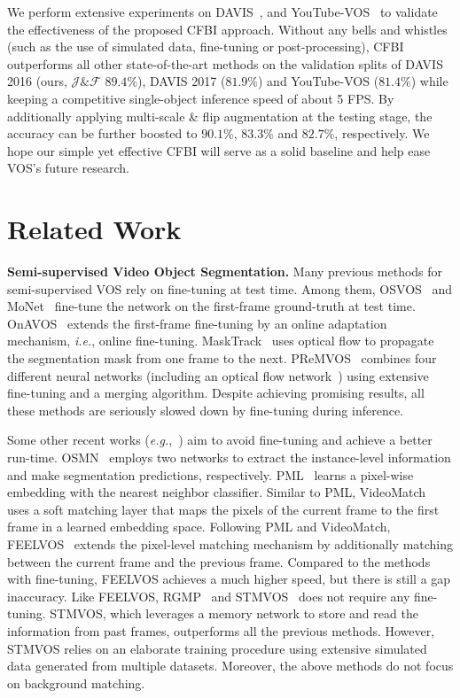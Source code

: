 \documentclass[runningheads]{llncs}
\def\eg{\emph{e.g.}}
\def\ie{\emph{i.e.}}
\begin{document}
We perform extensive experiments on DAVIS~\cite{davis2016,davis2017}, and YouTube-VOS~\cite{youtubevos} to validate the effectiveness of the proposed CFBI approach. Without any bells and whistles (such as the use of simulated data, fine-tuning or post-processing), CFBI outperforms all other state-of-the-art methods on the validation splits of DAVIS 2016 (ours, $\mathcal{J}\&\mathcal{F}$ $\mathbf{89.4\%}$), DAVIS 2017 ($\mathbf{81.9\%}$) and YouTube-VOS ($\mathbf{81.4\%}$) while keeping a competitive single-object inference speed of about 5 FPS. By additionally applying multi-scale \& flip augmentation at the testing stage, the accuracy can be further boosted to $\mathbf{90.1\%}$, $\mathbf{83.3\%}$ and $\mathbf{82.7\%}$, respectively. 
We hope our simple yet effective CFBI will serve as a solid baseline and help ease VOS's future research.


\section{Related Work}

\noindent\textbf{Semi-supervised Video Object Segmentation.}
Many previous methods for semi-supervised VOS rely on fine-tuning at test time. Among them, OSVOS~\cite{osvos} and MoNet~\cite{xiao2018monet} fine-tune the network on the first-frame ground-truth at test time. OnAVOS~\cite{onavos} extends the first-frame fine-tuning by an online adaptation mechanism, \ie, online fine-tuning. MaskTrack~\cite{masktrack} uses optical flow to propagate the segmentation mask from one frame to the next. PReMVOS~\cite{premvos} combines four different neural networks (including an optical flow network~\cite{flownet}) using extensive fine-tuning and a merging algorithm. Despite achieving promising results, all these methods are seriously slowed down by fine-tuning during inference.

Some other recent works (\eg,~\cite{osmn,favos}) aim to avoid fine-tuning and achieve a better run-time. OSMN~\cite{osmn} employs two networks to extract the instance-level information and make segmentation predictions, respectively.  PML~\cite{pml} learns a pixel-wise embedding with the nearest neighbor classifier. Similar to PML, VideoMatch~\cite{videomatch} uses a soft matching layer that maps the pixels of the current frame to the first frame in a learned embedding space. Following PML and VideoMatch, FEELVOS~\cite{feelvos} extends the pixel-level matching mechanism by additionally matching between the current frame and the previous frame. Compared to the methods with fine-tuning, FEELVOS achieves a much higher speed, but there is still a gap inaccuracy. Like FEELVOS, RGMP~\cite{rgmp} and STMVOS~\cite{spacetime} does not require any fine-tuning. STMVOS, which leverages a memory network to store and read the information from past frames, outperforms all the previous methods. However, STMVOS relies on an elaborate training procedure using extensive simulated data generated from multiple datasets. Moreover, the above methods do not focus on background matching.
\end{document}
